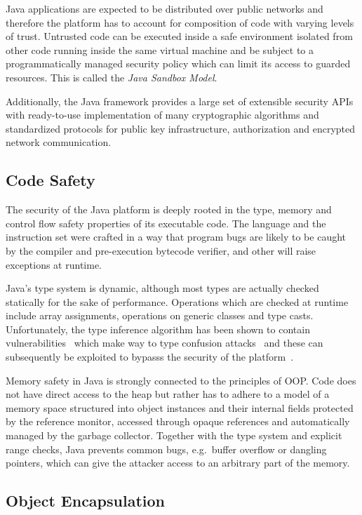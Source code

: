 \documentclass[a4paper,12pt,twoside,openright]{report}
\begin{document}
Java applications are expected to be distributed over public networks and therefore the platform has to account for composition of code with varying levels of trust. Untrusted code can be executed inside a safe environment isolated from other code running inside the same virtual machine and be subject to a programmatically managed security policy which can limit its access to guarded resources. This is called the \emph{Java Sandbox Model}.

Additionally, the Java framework provides a large set of extensible security APIs with ready-to-use implementation of many cryptographic algorithms and standardized protocols for public key infrastructure, authorization and encrypted network communication. 

\subsection{Code Safety}

The security of the Java platform is deeply rooted in the type, memory and control flow safety properties of its executable code. The language and the instruction set were crafted in a way that program bugs are likely to be caught by the compiler and pre-execution bytecode verifier, and other will raise exceptions at runtime. 

\label{section:TypeConfusion}
Java's type system is dynamic, although most types are actually checked statically for the sake of performance. Operations which are checked at runtime include array assignments, operations on generic classes and type casts. Unfortunately, the type inference algorithm has been shown to contain vulnerabilities~\cite{Suenaga:2012:JavaVulnerability} which make way to type confusion attacks~\cite{Oh:2012:JavaExploitReport} and these can subsequently be exploited to bypasss the security of the platform~\cite{McGraw:1999:SJG:298616}.

Memory safety in Java is strongly connected to the principles of OOP. Code does not have direct access to the heap but rather has to adhere to a model of a memory space structured into object instances and their internal fields protected by the reference monitor, accessed through opaque references and automatically managed by the garbage collector. Together with the type system and explicit range checks, Java prevents common bugs, e.g.\ buffer overflow or dangling pointers, which can give the attacker access to an arbitrary part of the memory.

\subsection{Object Encapsulation}
\end{document}
